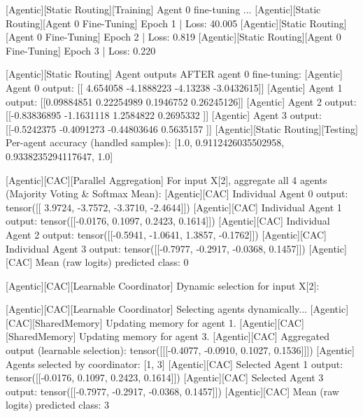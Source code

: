 [Agentic][Static Routing][Training] Agent 0 fine-tuning ...
[Agentic][Static Routing][Agent 0 Fine-Tuning] Epoch 1 | Loss: 40.005
[Agentic][Static Routing][Agent 0 Fine-Tuning] Epoch 2 | Loss: 0.819
[Agentic][Static Routing][Agent 0 Fine-Tuning] Epoch 3 | Loss: 0.220

[Agentic][Static Routing] Agent outputs AFTER agent 0 fine-tuning:
[Agentic] Agent 0 output: [[ 4.654058  -4.1888223 -4.13238   -3.0432615]]
[Agentic] Agent 1 output: [[0.09884851 0.22254989 0.1946752  0.26245126]]
[Agentic] Agent 2 output: [[-0.83836895 -1.1631118   1.2584822   0.2695332 ]]
[Agentic] Agent 3 output: [[-0.5242375  -0.4091273  -0.44803646  0.5635157 ]]
[Agentic][Static Routing][Testing] Per-agent accuracy (handled samples): [1.0, 0.9112426035502958, 0.9338235294117647, 1.0]

[Agentic][CAC][Parallel Aggregation] For input X[2], aggregate all 4 agents (Majority Voting & Softmax Mean):
[Agentic][CAC] Individual Agent 0 output: tensor([[ 3.9724, -3.7572, -3.3710, -2.4644]])
[Agentic][CAC] Individual Agent 1 output: tensor([[-0.0176,  0.1097,  0.2423,  0.1614]])
[Agentic][CAC] Individual Agent 2 output: tensor([[-0.5941, -1.0641,  1.3857, -0.1762]])
[Agentic][CAC] Individual Agent 3 output: tensor([[-0.7977, -0.2917, -0.0368,  0.1457]])
[Agentic][CAC] Mean (raw logits) predicted class: 0

[Agentic][CAC][Learnable Coordinator] Dynamic selection for input X[2]:

[Agentic][CAC][Learnable Coordinator] Selecting agents dynamically...
[Agentic][CAC][SharedMemory] Updating memory for agent 1.
[Agentic][CAC][SharedMemory] Updating memory for agent 3.
[Agentic][CAC] Aggregated output (learnable selection): tensor([[[-0.4077, -0.0910,  0.1027,  0.1536]]])
[Agentic] Agents selected by coordinator: [1, 3]
[Agentic][CAC] Selected Agent 1 output: tensor([[-0.0176,  0.1097,  0.2423,  0.1614]])
[Agentic][CAC] Selected Agent 3 output: tensor([[-0.7977, -0.2917, -0.0368,  0.1457]])
[Agentic][CAC] Mean (raw logits) predicted class: 3